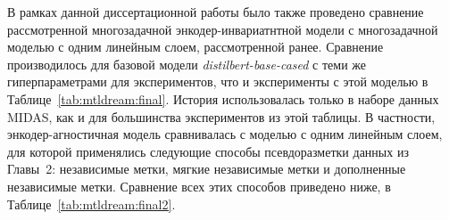 В рамках данной диссертационной работы было также проведено сравнение рассмотренной многозадачной энкодер-инвариатнтной модели с многозадачной моделью с одним линейным слоем, рассмотренной ранее. Сравнение производилось для базовой модели \textit{distilbert-base-cased} с теми же гиперпараметрами для экспериментов, что и эксперименты с этой моделью в Таблице~\ref{tab:mtldream:final}. История использовалась только в наборе данных MIDAS, как и для большинства экспериментов из этой таблицы.
В частности, энкодер-агностичная модель сравнивалась с моделью с одним линейным слоем, для которой применялись следующие способы псевдоразметки данных из Главы~2: независимые метки, мягкие независимые метки и дополненные независимые метки.
Сравнение всех этих способов приведено ниже, в Таблице~\ref{tab:mtldream:final2}.
\begin{table}[htbp]
\centering
\caption {Точность/взвешенный-F1) для оценки моделей в экспериментах с многозадачными моделями.  «Новая» означает энкодер-агностичную модель, описанную в Главе~3, «Старая» - модель с одним линейным слоем. Все модели основаны на \textit{distilbert-base-uncased}, с использованием истории только в наборе данных MIDAS. Для не-Коботовских задач при оценке используются оригинальные тестовые наборы данных, для коботовских -- тестовая часть разбиения данных. «Размер» означает размер обучающей выборки.}
\label{tab:mtldream:final2}%
\end{table}
